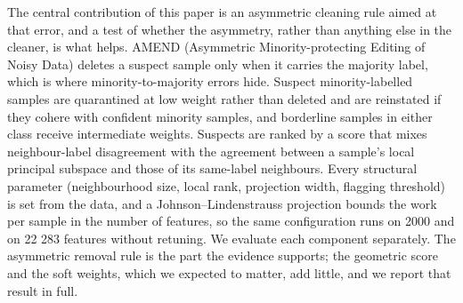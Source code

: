 \documentclass[conference]{IEEEtran}
\begin{document}
The central contribution of this paper is an asymmetric cleaning rule aimed at that error, and a test of whether the asymmetry, rather than anything else in the cleaner, is what helps. AMEND (Asymmetric Minority-protecting Editing of Noisy Data) deletes a suspect sample only when it carries the majority label, which is where minority-to-majority errors hide. Suspect minority-labelled samples are quarantined at low weight rather than deleted and are reinstated if they cohere with confident minority samples, and borderline samples in either class receive intermediate weights. Suspects are ranked by a score that mixes neighbour-label disagreement with the agreement between a sample's local principal subspace and those of its same-label neighbours. Every structural parameter (neighbourhood size, local rank, projection width, flagging threshold) is set from the data, and a Johnson--Lindenstrauss projection \cite{johnson1984} bounds the work per sample in the number of features, so the same configuration runs on 2000 and on 22 283 features without retuning. We evaluate each component separately. The asymmetric removal rule is the part the evidence supports; the geometric score and the soft weights, which we expected to matter, add little, and we report that result in full.
\end{document}
